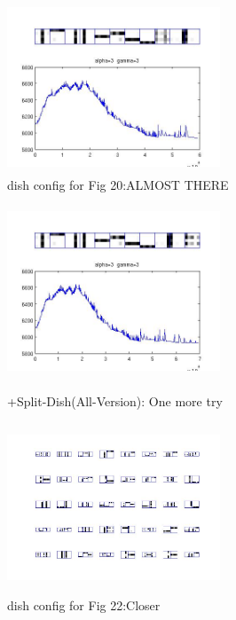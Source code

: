 \documentclass{article}
\begin{document}
\begin{spacing}{1.1}
\begin{figure}[h]
\begin{minipage}[b]{0.5\textwidth}
    \label{fig:by:table} 
  \end{minipage}%
  \begin{minipage}[b]{0.5\textwidth} 
    \centering 
    \includegraphics[width=2.5in,height=2in]{init1_5_nmt85_fur4.jpg} 
    \caption{dish config for Fig 20:ALMOST THERE}
    \label{fig:by:table}  
   \end{minipage}%
\end{figure}
\begin{figure}[h] 
  \begin{minipage}[b]{0.5\textwidth} 
    \centering 
    \includegraphics[width=2.5in,height=2in]{init1_5_nmt85_fur4_re_all.jpg} 
    \caption{+Split-Dish(All-Version): One more try}
    \label{fig:by:table} 
  \end{minipage}%
  \begin{minipage}[b]{0.5\textwidth} 
    \centering 
    \includegraphics[width=2.5in,height=2in]{init1_5_nmt85_fur4_re_alld.jpg} 
    \caption{dish config for Fig 22:Closer}
    \label{fig:by:table}  
   \end{minipage}%
\end{figure}


\end{spacing}
\end{document}
